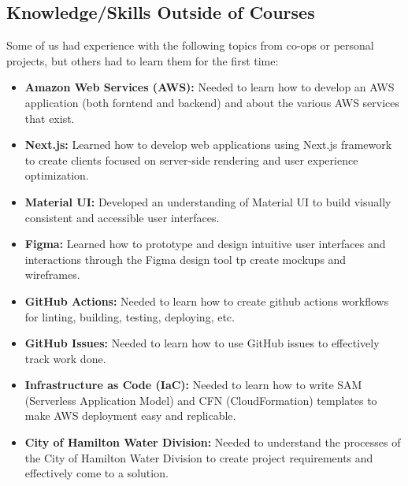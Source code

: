 \documentclass{article}
\begin{document}
\subsection{Knowledge/Skills Outside of Courses}
Some of us had experience with the following topics from co-ops or
personal projects, but others had to learn them for the first time:
\begin{itemize}
  \item \textbf{Amazon Web Services (AWS):} Needed to learn how to
    develop an AWS
    application (both forntend and backend) and about the various AWS
    services that exist.
  \item \textbf{Next.js:} Learned how to develop web applications
    using Next.js framework to create clients focused on server-side
    rendering and user experience optimization.
  \item \textbf{Material UI:} Developed an understanding of Material
    UI to build visually consistent and accessible user interfaces.
  \item \textbf{Figma:} Learned how to prototype and design intuitive
    user interfaces and interactions through the Figma design tool tp
    create mockups and wireframes.
  \item \textbf{GitHub Actions:} Needed to learn how to create github actions
    workflows for linting, building, testing, deploying, etc.
  \item \textbf{GitHub Issues:} Needed to learn how to use GitHub issues to
    effectively track work done.
  \item \textbf{Infrastructure as Code (IaC):} Needed to learn how to write SAM
    (Serverless Application Model) and CFN (CloudFormation) templates to
    make AWS deployment easy and replicable.
  \item \textbf{City of Hamilton Water Division:} Needed to understand the
    processes of the City of Hamilton Water Division to create
    project requirements and effectively come to a solution.
\end{itemize}
\end{document}
